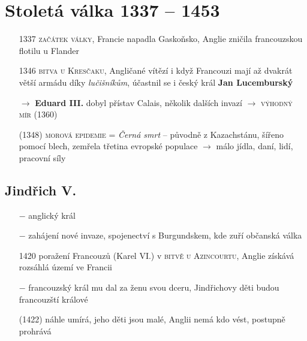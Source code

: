 \documentclass{article}
\begin{document}
\section*{Stoletá válka 1337 -- 1453}
\begin{itemize}
    \vspace{-0.5em}
    \setlength\itemsep{0.15em}
    \item[1337] \textsc{začátek války}, Francie napadla Gaskoňsko, Anglie zničila francouzskou flotilu u Flander
    \item[1346] \textsc{bitva u Kresčaku}, Angličané vítězí i když Francouzi mají až dvakrát větší armádu díky \textit{lučišníkům}, účastnil se i český král \textbf{Jan Lucemburský}
    \item[$\rightarrow$] \textbf{Eduard III.} dobyl přístav Calais, několik dalších invazí $\rightarrow$ \textsc{výhodný mír} (1360)
    \item[(1348)] \textsc{morová epidemie} = \textit{Černá smrt}  -- původně z Kazachstánu, šířeno pomocí blech, zemřela třetina evropské populace $\rightarrow$ málo jídla, daní, lidí, pracovní síly
\end{itemize}

\subsection*{Jindřich V.}
\begin{itemize}
    \vspace{-0.5em}
    \setlength\itemsep{0.15em}
    \item[$-$] anglický král
    \item[$-$] zahájení nové invaze, spojenectví s Burgundskem, kde zuří občanská válka
    \item[1420] poražení Francouzů (Karel VI.) v \textsc{bitvě u Azincourtu}, Anglie získává rozsáhlá území ve Francii
    \item[$-$] francouzský král mu dal za ženu svou dceru, Jindřichovy děti budou francouzští králové
    \item[(1422)] náhle umírá, jeho děti jsou malé, Anglii nemá kdo vést, postupně prohrává
\end{itemize}
\end{document}

